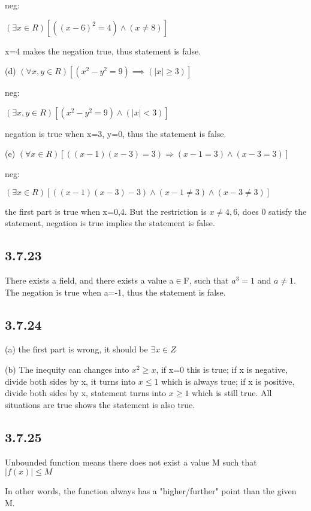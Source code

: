 \documentclass{article}
\begin{document}
neg:

$\left(\exists x\in R\right)\left[\left(\left(x-6\right)^{2}=4\right)\wedge\left(x\neq8\right)\right]$

x=4 makes the negation true, thus statement is false.

(d) $\left(\forall x,y\in R\right)[(x^{2}-y^{2}=9)\implies\left(|x|\geq 3\right)]$

neg:

$\left(\exists x,y\in R\right)[(x^{2}-y^{2}=9)\land\left(|x|<3\right)]$

negation is true when x=3, y=0, thus the statement is false.

(e) $(\forall x\in R)[((x-1)(x-3)=3)\Rightarrow(x-1=3)\land(x-3=3)]$

neg:

$(\exists x\in R)[((x-1)(x-3)-3)\land(x-1\neq3)\land(x-3\neq3)]$

the first part is true when x=0,4. But the restriction is $x\neq 4, 6$, does 0 satisfy the statement, negation is true implies the statement is false.

\subsection*{3.7.23}

There exists a field, and there exists a value a$\in$F, such that $a^3=1$ and $a\neq 1$. The negation is true when a=-1, thus the statement is false.

\subsection*{3.7.24}

(a) the first part is wrong, it should be $\exists x \in Z$

(b) The inequity can changes into $x^2\geq x$, if x=0 this is true; if x is negative, divide both sides by x, it turns into $x\leq 1$ which is always true; if x is positive, divide both sides by x,  statement turns into $x\geq 1$ which is still true. All situations are true shows the statement is also true.

\subsection*{3.7.25}

Unbounded function means there does not exist a value M such that $|f(x)|\leq M$

In other words, the function always has a "higher/further" point than the given M. 
\end{document}
